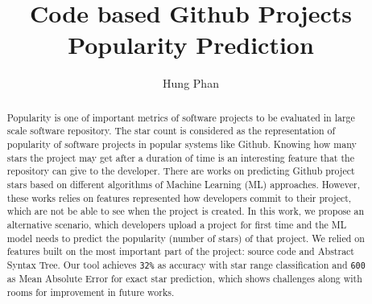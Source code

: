 \documentclass[sigconf]{acmart}
\title[CodeBasedStarPrediction]{Code based Github Projects Popularity Prediction}
\author[1]{Hung Phan}
\affil[1]{Computer Science Department, Iowa State University}
\begin{document}
\begin{abstract}
Popularity is one of important metrics of software projects to be evaluated in large scale software repository. The star count is considered as the representation of popularity of software projects in popular systems like Github. Knowing how many stars the project may get after a duration of time is an interesting feature that the repository can give to the developer. There are works on predicting Github project stars based on different algorithms of Machine Learning (ML) approaches. However, these works relies on features represented how developers commit to their project, which are not be able to see when the project is created. In this work, we propose an alternative scenario, which developers upload a project for first time and the ML model needs to predict the popularity (number of stars) of that project. We relied on features built on the most important part of the project: source code and Abstract Syntax Tree. Our tool achieves \texttt{32\%} as accuracy with star range classification and \texttt{600} as Mean Absolute Error for exact star prediction, which shows challenges along with rooms for improvement in future works.   
\end{abstract}





\maketitle








\clearpage



\end{document}
